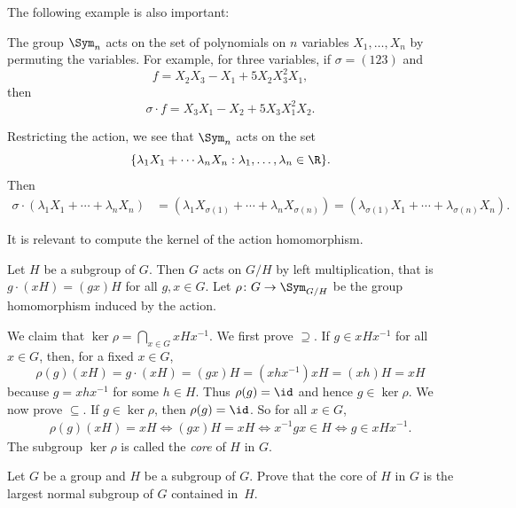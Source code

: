 The following example is also important: 

\begin{optional}
\begin{example}
    The group $\Sym_n$ acts on the set of polynomials on
    $n$ variables $X_1,\dots,X_n$
    by permuting the variables. For example, for three variables, if 
    $\sigma=(123)$ and 
    \[
    f=X_2X_3-X_1+5X_2X_3^2X_1,
    \]
    then 
    \[
    \sigma\cdot f=X_3X_1-X_2+5X_3X_1^2X_2.
    \]

    Restricting the action, we see that 
    $\Sym_n$ acts on the set 
    \[
    \{\lambda_1X_1+\cdots\lambda_nX_n:\lambda_1,\dots,\lambda_n\in\R\}.
    \]
    Then 
    \begin{align*}
    \sigma \cdot (\lambda_1X_1+\cdots+\lambda_nX_n) &= (\lambda_1X_{\sigma(1)}+\cdots+\lambda_nX_{\sigma(n)})
    =(\lambda_{\sigma(1)}X_1+\cdots+\lambda_{\sigma(n)}X_n).
    \end{align*}
\end{example}
\end{optional}


It is relevant to compute the kernel of the action homomorphism. 

\begin{example}
Let $H$ be a subgroup of $G$. Then $G$ 
acts on $G/H$ by left multiplication, that is 
$g\cdot (xH)=(gx)H$ for all $g,x\in G$. Let $\rho\colon G\to\Sym_{G/H}$ be the group homomorphism induced by the action. 

We claim that $\ker\rho=\bigcap_{x\in G}xHx^{-1}$. 
We first prove $\supseteq$. If $g\in xHx^{-1}$ for all 
$x\in G$, then, for a fixed $x\in G$,
 \[
 \rho(g)(xH)=g\cdot (xH)=(gx)H=(xhx^{-1})xH=(xh)H=xH
 \]
because $g=xhx^{-1}$ for some $h\in H$. Thus $\rho(g)=\id$ 
and hence $g\in\ker\rho$. We now prove 
$\subseteq$. If $g\in\ker\rho$, then
 $\rho(g)=\id$. So for all $x\in G$,
 \begin{align*}
\rho(g)(xH)=xH
\Longleftrightarrow (gx)H=xH
\Longleftrightarrow x^{-1}gx\in H
\Longleftrightarrow g\in xHx^{-1}.
 \end{align*}
The subgroup $\ker\rho$ is called the \emph{core} of $H$ in $G$. 
\end{example}

\begin{exercise}
    Let $G$ be a group and $H$ be a subgroup of $G$. Prove that
    the core 
    of $H$ in $G$ is the largest normal subgroup of $G$ 
    contained in~$H$.
\end{exercise}

